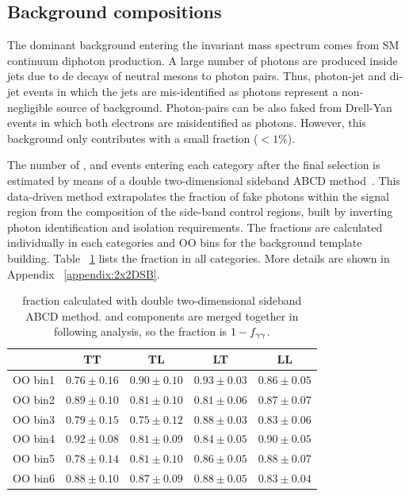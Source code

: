 \subsection{Background compositions}
\label{ssec:bkg_composition}

The dominant background entering the invariant mass spectrum comes from SM continuum diphoton production. A large number of photons are produced inside jets due to de decays of neutral mesons to photon pairs. Thus, photon-jet and di-jet events in which the jets are mis-identified as photons represent a non-negligible source of background. Photon-pairs can be also faked from Drell-Yan events in which both electrons are misidentified as photons. However, this background only contributes with a small fraction ($<1\%$). 

The number of \yy, \yjet and \jetjet events entering each category after the final selection is estimated by means of a double two-dimensional sideband ABCD method~\cite{ATL-COM-PHYS-2012-592}. This data-driven method extrapolates the fraction of fake photons within the signal region from the composition of the side-band control regions, built by inverting photon identification and isolation requirements. The fractions are calculated individually in each categories and OO bins for the background template building. Table ~\ref{tab:yyfraction} lists the \yy fraction in all categories. More details are shown in Appendix ~\ref{appendix:2x2DSB}. 

\begin{table}[htbp]
  \centering
  \begin{tabular}{c|cccc}
  \toprule
           &  TT  &  TL  &  LT  &  LL  \\ 
  \toprule
  OO bin1  & $0.76 \pm 0.16$ & $0.90 \pm 0.10$ & $0.93 \pm 0.03$ & $0.86 \pm 0.05$ \\ \hline
  OO bin2  & $0.89 \pm 0.10$ & $0.81 \pm 0.10$ & $0.81 \pm 0.06$ & $0.87 \pm 0.07$ \\ \hline
  OO bin3  & $0.79 \pm 0.15$ & $0.75 \pm 0.12$ & $0.88 \pm 0.03$ & $0.83 \pm 0.06$ \\ \hline
  OO bin4  & $0.92 \pm 0.08$ & $0.81 \pm 0.09$ & $0.84 \pm 0.05$ & $0.90 \pm 0.05$ \\ \hline
  OO bin5  & $0.78 \pm 0.14$ & $0.81 \pm 0.10$ & $0.86 \pm 0.05$ & $0.88 \pm 0.07$ \\ \hline
  OO bin6  & $0.88 \pm 0.10$ & $0.87 \pm 0.09$ & $0.88 \pm 0.05$ & $0.83 \pm 0.04$ \\
  \bottomrule
  \end{tabular}
  \caption{\yy fraction calculated with double two-dimensional sideband ABCD method. \yjet and \jetjet components are merged together in following analysis, so the fraction is $1-f_{\gamma\gamma}$. }
  \label{tab:yyfraction}
\end{table}

